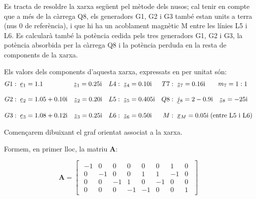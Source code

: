 \begin{exemple}\label{ex:XarxaAmbAcobl}
	\addcontentsxms{\XarxaAmbAcobl}
    Es tracta de resoldre la xarxa següent pel mètode dels nusos; cal
    tenir en compte que a més de la càrrega Q8, els generadors G1, G2 i
    G3 també estan units a terra (nus 0 de referència), i que hi ha un
    acoblament magnètic M entre les línies L5 i L6. Es calcularà també
    la potència cedida pels tres generadors G1, G2 i G3, la potència
    absorbida per la càrrega Q8 i la potència perduda en la resta de
    components de la xarxa.
    \begin{center}
       
    \end{center}

    Els valors dels components d'aquesta xarxa, expressats en per unitat són:
    \begin{align*}
       G1 &:\; \cmplx{e}_1 = \num{1,1} \qquad\qquad\;\;\, \cmplx{z}_1 = \complexnum{j 0,25} & L4 &:\; \cmplx{z}_4 = \complexnum{j 0,10} & T7 &:\; \cmplx{z}_7 = \complexnum{j 0,16} \quad\quad m_7=1:1\\*[3mm]
       G2 &:\; \cmplx{e}_2 = \complexnum{1,05+j0,10} \quad \cmplx{z}_2 = \complexnum{j 0,20} & L5 &:\; \cmplx{z}_5 = \complexnum{j 0,405}  & Q8 &:\; \cmplx{j}_8 = \complexnum{2-j0,9} \quad \cmplx{z}_8 = \complexnum{-j25} \\[3mm]
       G3 &:\; \cmplx{e}_3 = \complexnum{1,08+j0,12} \quad \cmplx{z}_3 = \complexnum{j 0,25} & L6 &:\; \cmplx{z}_6 = \complexnum{j 0,50} & M &:\; \cmplx{x}_M = \complexnum{j0,05}\; \text{(entre L5 i L6)}
    \end{align*}

    Començarem dibuixant el graf orientat associat a la xarxa.
    \begin{center}
         
    \end{center}

	Formem, en primer lloc, la matriu $\boldsymbol{A}$:
	
    \[
       \boldsymbol{A} = 
       \begin{bmatrix}\begin{array}{rrrrrrrr}
         -1 & 0 & 0 & 0 & 0 & 0 & 1 & 0 \\
         0 & -1 & 0 & 0 & 1 & 1 & -1 & 0 \\
         0 & 0 & -1 & 1 & 0 & -1 & 0 & 0 \\
         0 & 0 & 0 & -1 & -1 & 0 & 0 & 1
       \end{array}\end{bmatrix}
    \]


\end{exemple}
